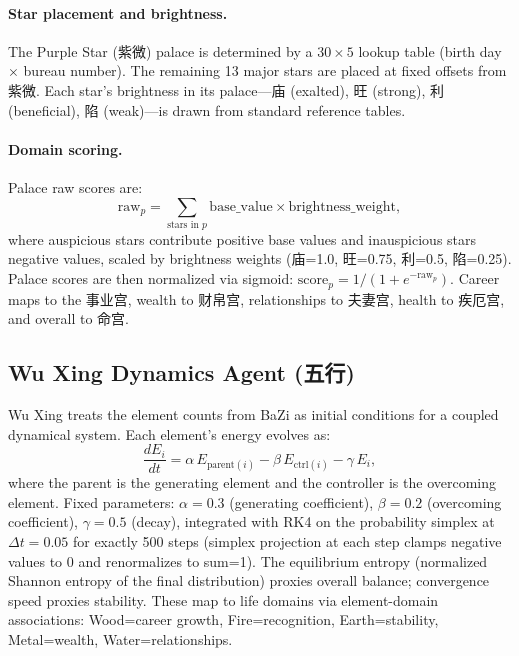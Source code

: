 \documentclass[11pt]{article}
\begin{document}
\paragraph{Star placement and brightness.}
The Purple Star (紫微) palace is determined by a $30 \times 5$ lookup table (birth day $\times$ bureau number).
The remaining 13 major stars are placed at fixed offsets from 紫微.
Each star's brightness in its palace---庙 (exalted), 旺 (strong), 利 (beneficial), 陷 (weak)---is drawn from standard reference tables.

\paragraph{Domain scoring.}
Palace raw scores are:
\begin{equation}
  \text{raw}_p = \sum_{\text{stars in } p} \text{base\_value} \times \text{brightness\_weight},
\end{equation}
where auspicious stars contribute positive base values and inauspicious stars negative values, scaled by brightness weights (庙=1.0, 旺=0.75, 利=0.5, 陷=0.25).
Palace scores are then normalized via sigmoid: $\text{score}_p = 1/(1+e^{-\text{raw}_p})$.
Career maps to the 事业宫, wealth to 财帛宫, relationships to 夫妻宫, health to 疾厄宫, and overall to 命宫.

\subsection{Wu Xing Dynamics Agent (五行)}

Wu Xing treats the element counts from BaZi as initial conditions for a coupled dynamical system.
Each element's energy evolves as:
\begin{equation}
  \frac{dE_i}{dt} = \alpha \, E_{\text{parent}(i)} - \beta \, E_{\text{ctrl}(i)} - \gamma \, E_i,
\end{equation}
where the parent is the generating element and the controller is the overcoming element.
Fixed parameters: $\alpha=0.3$ (generating coefficient), $\beta=0.2$ (overcoming coefficient), $\gamma=0.5$ (decay), integrated with RK4 on the probability simplex at $\Delta t=0.05$ for exactly 500 steps (simplex projection at each step clamps negative values to 0 and renormalizes to sum=1).
The equilibrium entropy (normalized Shannon entropy of the final distribution) proxies overall balance; convergence speed proxies stability.
These map to life domains via element-domain associations: Wood=career growth, Fire=recognition, Earth=stability, Metal=wealth, Water=relationships.
\end{document}
